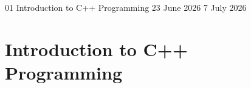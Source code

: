 \GenerateCoverPage
{01} %
{Introduction to C++ Programming} %
{23 June 2026} %
{7 July 2026} %

\noindent

\chapter{Introduction to C++ Programming}







\setcounter{section}{0}
